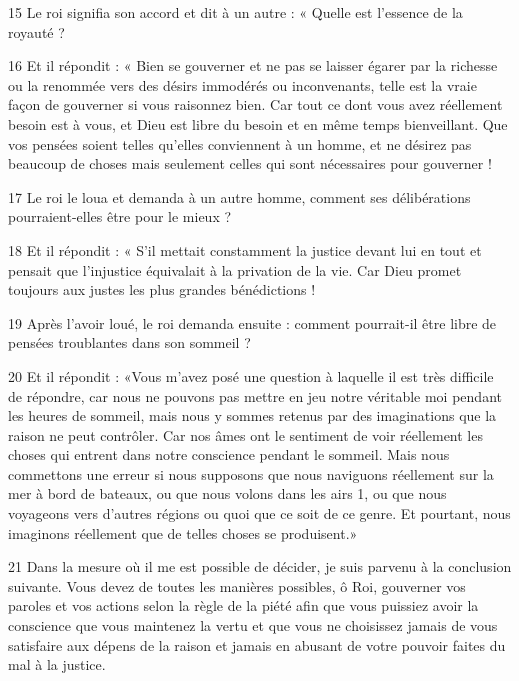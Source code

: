 \par 15 Le roi signifia son accord et dit à un autre : « Quelle est l'essence de la royauté ?

\par 16 Et il répondit : « Bien se gouverner et ne pas se laisser égarer par la richesse ou la renommée vers des désirs immodérés ou inconvenants, telle est la vraie façon de gouverner si vous raisonnez bien. Car tout ce dont vous avez réellement besoin est à vous, et Dieu est libre du besoin et en même temps bienveillant. Que vos pensées soient telles qu'elles conviennent à un homme, et ne désirez pas beaucoup de choses mais seulement celles qui sont nécessaires pour gouverner !

\par 17 Le roi le loua et demanda à un autre homme, comment ses délibérations pourraient-elles être pour le mieux ?

\par 18 Et il répondit : « S'il mettait constamment la justice devant lui en tout et pensait que l'injustice équivalait à la privation de la vie. Car Dieu promet toujours aux justes les plus grandes bénédictions !

\par 19 Après l'avoir loué, le roi demanda ensuite : comment pourrait-il être libre de pensées troublantes dans son sommeil ?

\par 20 Et il répondit : «Vous m'avez posé une question à laquelle il est très difficile de répondre, car nous ne pouvons pas mettre en jeu notre véritable moi pendant les heures de sommeil, mais nous y sommes retenus par des imaginations que la raison ne peut contrôler. Car nos âmes ont le sentiment de voir réellement les choses qui entrent dans notre conscience pendant le sommeil. Mais nous commettons une erreur si nous supposons que nous naviguons réellement sur la mer à bord de bateaux, ou que nous volons dans les airs 1, ou que nous voyageons vers d'autres régions ou quoi que ce soit de ce genre. Et pourtant, nous imaginons réellement que de telles choses se produisent.»

\par 21 Dans la mesure où il me est possible de décider, je suis parvenu à la conclusion suivante. Vous devez de toutes les manières possibles, ô Roi, gouverner vos paroles et vos actions selon la règle de la piété afin que vous puissiez avoir la conscience que vous maintenez la vertu et que vous ne choisissez jamais de vous satisfaire aux dépens de la raison et jamais en abusant de votre pouvoir faites du mal à la justice.

